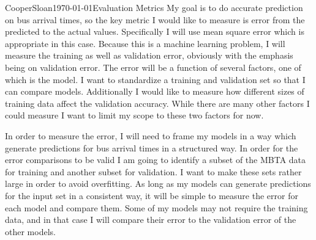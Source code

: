 \documentclass[12pt,letterpaper]{article}
\begin{document}
\begin{mla}{Cooper}{Sloan}{\today}{Evaluation Metrics}
My goal is to do accurate prediction on bus arrival times, so the key metric I would like to measure is error from the predicted to the actual values.  Specifically I will use mean square error which is appropriate in this case.  Because this is a machine learning problem, I will measure the training as well as validation error, obviously with the emphasis being on validation error.  The error will be a function of several factors, one of which is the model.  I want to standardize a training and validation set so that I can compare models.  Additionally I would like to measure how different sizes of training data affect the validation accuracy.  While there are many other factors I could measure I want to limit my scope to these two factors for now.

In order to measure the error, I will need to frame my models in a way which generate predictions for bus arrival times in a structured way.  In order for the error comparisons to be valid I am going to identify a subset of the MBTA data for training and another subset for validation.  I want to make these sets rather large in order to avoid overfitting.  As long as my models can generate predictions for the input set in a consistent way, it will be simple to measure the error for each model and compare them.  Some of my models may not require the training data, and in that case I will compare their error to the validation error of the other models.



\end{mla}
\end{document}
